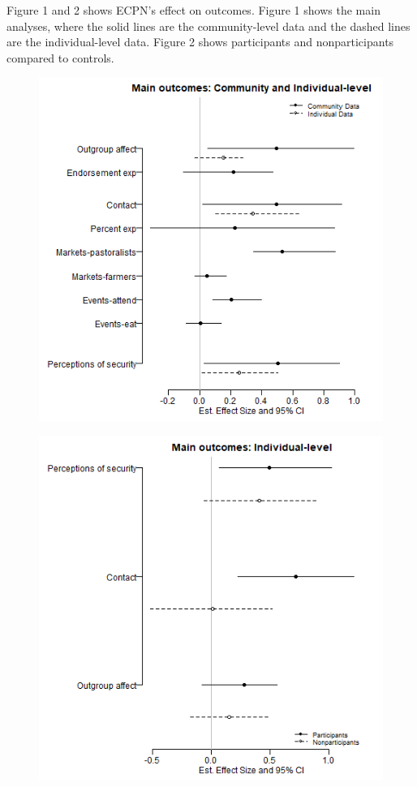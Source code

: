 \documentclass[11pt]{article}
\begin{document}
Figure 1 and 2 shows ECPN's effect on outcomes. Figure 1 shows the main
analyses, where the solid lines are the community-level data and the
dashed lines are the individual-level data. Figure 2 shows participants
and nonparticipants compared to controls.

\begin{figure}[!h]
    \begin{minipage}[b]{.48\textwidth}
        \includegraphics[width=\linewidth]{../../figs/ecpn_coefplots_MainOuts-cats.png}
        \label{fig:fig1}
    \end{minipage}
    \hfill
    \begin{minipage}[b]{.48\textwidth}
        \includegraphics[width=\linewidth]{../../figs/ecpn_coefplots_MainOuts_panel-cats.png}

\end{minipage}
\end{figure}
\end{document}
